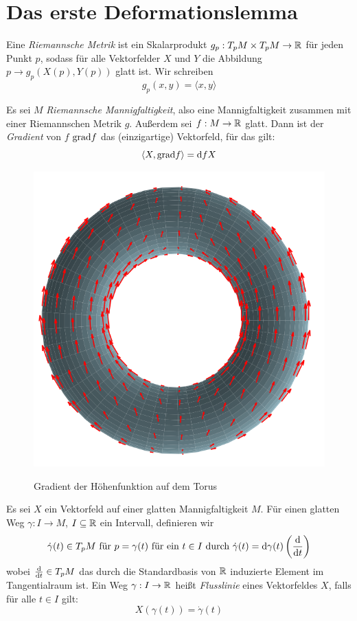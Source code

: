 \section{Das erste Deformationslemma}

\begin{definition}
    Eine \textit{Riemannsche Metrik} ist ein Skalarprodukt 
    $g_p:T_pM \times T_pM \to { \mathbb R }$ für jeden Punkt $p$, sodass für alle 
    Vektorfelder $X$ und $Y$ die Abbildung $p \to g_p(X(p), Y(p))$ glatt ist.
    Wir schreiben 
    \[ g_p(x, y) = \langle x, y \rangle \]
\end{definition}

\begin{definition}[Gradient]
    Es sei $M$ \textit{Riemannsche Mannigfaltigkeit}, also eine Mannigfaltigkeit
    zusammen mit einer Riemannschen Metrik $g$. Außerdem sei $f: M \to { \mathbb R }$ glatt.
    Dann ist der \textit{Gradient} von $f$ ${ \operatorname{grad} } f$ das (einzigartige) 
    Vektorfeld, für das gilt:
    \[ \langle X, { \operatorname{grad} } f \rangle = { \operatorname{d} } fX \]
\end{definition}

\begin{figure}[H]
    \centering
    \includegraphics[width=0.7\linewidth]{resources/Me-Diagram4-gradient-of-hightmapping.png}
    \label{fig:me-diagram4}
    \caption{Gradient der Höhenfunktion auf dem Torus}
\end{figure}

\begin{definition}
    Es sei $X$ ein Vektorfeld auf einer glatten Mannigfaltigkeit $M$. Für einen
    glatten Weg $\gamma: I \to M$, $I \subseteq { \mathbb R }$ ein Intervall, 
    definieren wir
    \[ \dot{\gamma}(t) \in T_pM \text{ für } p = \gamma(t) \text{ für ein } t \in I \text{ durch } 
    \dot{\gamma}(t) = { \operatorname{d} } \gamma (t) \left({ \frac{{ \operatorname{d} } }{{ \operatorname{d} } t} }\right) \]
    wobei ${ \frac{{ \operatorname{d} } }{{ \operatorname{d} } t} } \in T_pM$ das durch die Standardbasis von ${ \mathbb R }$
    induzierte Element im Tangentialraum ist.
    Ein Weg $\gamma: I \to { \mathbb R }$ heißt \textit{Flusslinie} eines Vektorfeldes $X$,
    falls für alle $t \in I$ gilt:
    \[ X(\gamma(t)) = \dot{\gamma}(t) \]
\end{definition}

